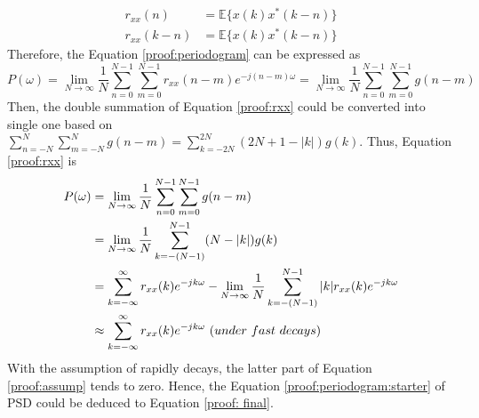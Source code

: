 \begin{equation}
\begin{split}
r_{xx}(n) &= \mathbb E\bigg\{ x(k)x^*(k-n)\bigg\}\\
r_{xx}(k-n) &= \mathbb E\bigg\{ x(k)x^*(k-n)\bigg\}
\label{proof:corr}
\end{split}
\end{equation}
Therefore, the Equation \ref{proof:periodogram} can be expressed as
\begin{equation}
P(\omega)=\lim\limits_{N \to \infty} \frac{1}{N} \sum_{n=0}^{N-1} \sum_{m=0}^{N-1}	r_{xx}(n-m)e^{-j(n-m)\omega}=\lim\limits_{N \to \infty} \frac{1}{N} \sum_{n=0}^{N-1} \sum_{m=0}^{N-1} g(n-m)
\label{proof:rxx}
\end{equation}
Then, the double summation of Equation \ref{proof:rxx} could be converted into single one based on $\sum_{n=-N}^N \sum_{m=-N}^N g(n-m)=\sum_{k =-2N}^{2N}(2N+1-|k|)g(k)$. Thus, Equation \ref{proof:rxx} is 
\begin{align}
P(\omega)&=\lim\limits_{N \to \infty} \frac{1}{N} \sum_{n=0}^{N-1} \sum_{m=0}^{N-1} g(n-m)\notag\\
&=\lim\limits_{N \to \infty} \frac{1}{N} \sum_{k=-(N-1)}^{N-1}(N-|k|) g(k)\notag\\
&=\sum_{k=-\infty}^{\infty} r_{xx}(k) e^{-jk\omega}  - \lim_{N\to\infty} \frac{1}{N} \sum_{k=-(N-1)}^{N-1} |k| r_{xx}(k) e^{-jk\omega}\label{proof:assump}\\
&\approx \sum_{k=-\infty}^{\infty} r_{xx}(k) e^{-jk\omega} \  (under \ fast \ decays)
\label{proof: final}
\end{align}
With the assumption of rapidly decays, the latter part of Equation \ref{proof:assump} tends to zero. Hence, the Equation \ref{proof:periodogram:starter} of PSD could be deduced to Equation \ref{proof: final}.












